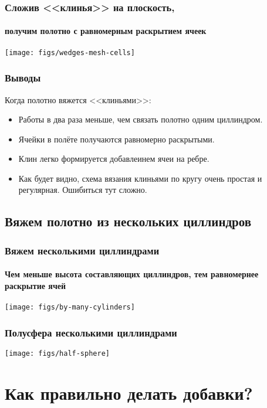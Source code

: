 \begin{frame}
    \frametitle{Сложив <<клинья>> на плоскость,}
    \framesubtitle{получим полотно с равномерным раскрытием ячеек}

    \begin{center}
        \texttt{[image: figs/wedges-mesh-cells]}
    \end{center}
\end{frame}

\begin{frame}
    \frametitle{Выводы}

	Когда полотно вяжется <<клиньями>>:
    \begin{itemize}
        \item Работы в два раза меньше, чем связать полотно одним циллиндром.
        \item Ячейки в полёте получаются равномерно раскрытыми.
		\item Клин легко формируется добавлеинем ячеи на ребре.
        \item Как будет видно, схема вязания клиньями по кругу очень простая и регулярная. Ошибиться тут сложно.
    \end{itemize}
\end{frame}


\subsection{Вяжем полотно из нескольких циллиндров}

\begin{frame}
    \frametitle{Вяжем несколькими циллиндрами}
    \framesubtitle{Чем меньше высота составляющих циллиндров, тем равномернее раскрытие ячей}

    \begin{center}
        \texttt{[image: figs/by-many-cylinders]}
    \end{center}
\end{frame}

\begin{frame}
    \frametitle{Полусфера несколькими циллиндрами}

    \begin{center}
        \texttt{[image: figs/half-sphere]}
    \end{center}
\end{frame}


\section{Как правильно делать добавки?}

